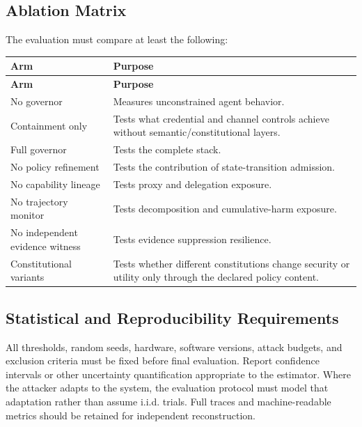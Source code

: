 \documentclass[11pt]{article}
\begin{document}
\subsection{Ablation Matrix}
The evaluation must compare at least the following:
\begin{longtable}{@{}L{4.4cm} L{9.2cm}@{}}
\toprule
\textbf{Arm} & \textbf{Purpose}\\
\midrule
\endfirsthead
\toprule
\textbf{Arm} & \textbf{Purpose}\\
\midrule
\endhead
\bottomrule
\endfoot
No governor & Measures unconstrained agent behavior. \\
Containment only & Tests what credential and channel controls achieve without semantic/constitutional layers. \\
Full governor & Tests the complete stack. \\
No policy refinement & Tests the contribution of state-transition admission. \\
No capability lineage & Tests proxy and delegation exposure. \\
No trajectory monitor & Tests decomposition and cumulative-harm exposure. \\
No independent evidence witness & Tests evidence suppression resilience. \\
Constitutional variants & Tests whether different constitutions change security or utility only through the declared policy content. \\
\end{longtable}

\subsection{Statistical and Reproducibility Requirements}
All thresholds, random seeds, hardware, software versions, attack budgets, and exclusion criteria must be fixed before final evaluation. Report confidence intervals or other uncertainty quantification appropriate to the estimator. Where the attacker adapts to the system, the evaluation protocol must model that adaptation rather than assume i.i.d. trials. Full traces and machine-readable metrics should be retained for independent reconstruction.
\end{document}

